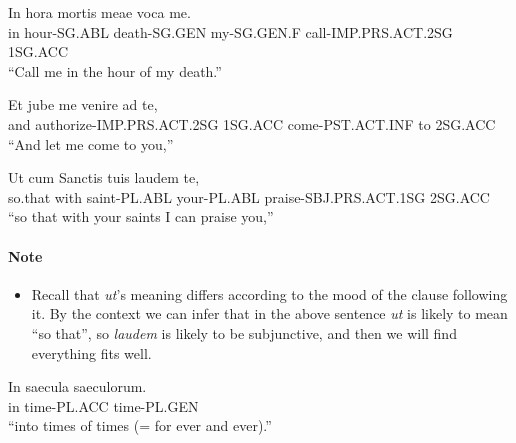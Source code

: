\documentclass[a4paper]{article}
\begin{document}
\begin{exe}
\sn 
\gll  In hora        mortis        meae        voca                  me. \\
      in hour-SG.ABL death-SG.GEN  my-SG.GEN.F call-IMP.PRS.ACT.2SG  1SG.ACC \\
\glt ``Call me in the hour of my death.''

\sn
\gll Et   jube                       me        venire             ad   te, \\
     and  authorize-IMP.PRS.ACT.2SG  1SG.ACC   come-PST.ACT.INF   to   2SG.ACC \\
\glt ``And let me come to you,''

\sn
\gll Ut        cum   Sanctis       tuis          laudem                  te, \\
     so.that   with  saint-PL.ABL  your-PL.ABL   praise-SBJ.PRS.ACT.1SG  2SG.ACC \\
\glt ``so that with your saints I can praise you,''

\paragraph{Note} \begin{itemize}
    \item Recall that \emph{ut}'s meaning differs according to the mood of the clause following it. By the context we can infer that in the above sentence \emph{ut} is likely to mean ``so that'', so \emph{laudem} is likely to be subjunctive, and then we will find everything fits well.
\end{itemize}

\sn
\gll In   saecula      saeculorum. \\
     in   time-PL.ACC  time-PL.GEN \\
\glt ``into times of times (= for ever and ever).''
\end{exe}


 
\end{document}
